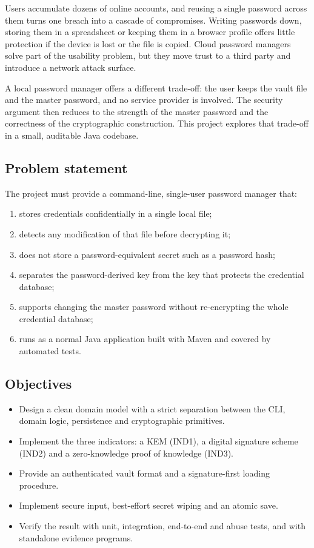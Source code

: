\documentclass[11pt,a4paper]{article}
\begin{document}
Users accumulate dozens of online accounts, and reusing a single password across
them turns one breach into a cascade of compromises. Writing passwords down,
storing them in a spreadsheet or keeping them in a browser profile offers little
protection if the device is lost or the file is copied. Cloud password managers
solve part of the usability problem, but they move trust to a third party and
introduce a network attack surface.

A local password manager offers a different trade-off: the user keeps the vault
file and the master password, and no service provider is involved. The security
argument then reduces to the strength of the master password and the correctness
of the cryptographic construction. This project explores that trade-off in a
small, auditable Java codebase.

\subsection{Problem statement}

The project must provide a command-line, single-user password manager that:

\begin{enumerate}[label=\textbf{P\arabic*.},leftmargin=*]
  \item stores credentials confidentially in a single local file;
  \item detects any modification of that file before decrypting it;
  \item does not store a password-equivalent secret such as a password hash;
  \item separates the password-derived key from the key that protects the
        credential database;
  \item supports changing the master password without re-encrypting the whole
        credential database;
  \item runs as a normal Java application built with Maven and covered by
        automated tests.
\end{enumerate}

\subsection{Objectives}

\begin{itemize}[leftmargin=*]
  \item Design a clean domain model with a strict separation between the CLI,
        domain logic, persistence and cryptographic primitives.
  \item Implement the three indicators: a KEM (IND1), a digital signature scheme
        (IND2) and a zero-knowledge proof of knowledge (IND3).
  \item Provide an authenticated vault format and a signature-first loading
        procedure.
  \item Implement secure input, best-effort secret wiping and an atomic save.
  \item Verify the result with unit, integration, end-to-end and abuse tests, and
        with standalone evidence programs.
\end{itemize}
\end{document}

